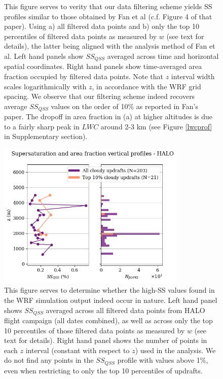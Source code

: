 \documentclass{article}
\begin{document}
\begin{figure}[ht]
\begin{subfigure}{0.7\textwidth}
		\caption{}
		\label{wrfbipanelup50perc}
	\end{subfigure}
	\caption{This figure serves to verity that our data filtering scheme yields SS profiles similar to those obtained by Fan et al (c.f. Figure 4 of that paper). Using a) all filtered data points and b) only the top 10 percentiles of filtered data points as measured by $w$ (see text for details), the latter being aligned with the analysis method of Fan et al. Left hand panels show $SS_{QSS}$ averaged across time and horizontal spatial coordinates. Right hand panels show time-averaged area fraction occupied by filtered data points. Note that $z$ interval width scales logarithmically with $z$, in accordance with the WRF grid spacing. We observe that our filtering scheme indeed recovers average $SS_{QSS}$ values on the order of 10\% as reported in Fan's paper. The dropoff in area fraction in (a) at higher altitudes is due to a fairly sharp peak in $LWC$ around 2-3 km (see Figure \ref{lwcprof} in Supplementary section).}
	\label{wrfbipanel}
\end{figure}

\begin{figure}[ht]
    \centering
    \includegraphics[width=9cm]{revhalo/v8_FINAL_combined_bipanel_ss_qss_vs_z_figure.png}
    \caption{This figure serves to determine whether the high-SS values found in the WRF simulation output indeed occur in nature. Left hand panel shows $SS_{QSS}$ averaged across all filtered data points from HALO flight campaign (all dates combined), as well as across only the top 10 percentiles of those filtered data points as measured by $w$ (see text for details). Right hand panel shows the number of points in each $z$ interval (constant with respect to $z$) used in the analysis. We do not find any points in the $SS_{QSS}$ profile with values above 1\%, even when restricting to only the top 10 percentiles of updrafts.}
    \label{halobipanel}
\end{figure}
\end{document}
